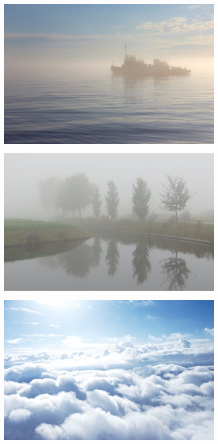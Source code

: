 \begin{figure}[H]
    \centering
    \includegraphics[width=\linewidth]{fogs/fog07.jpg} 
    \caption{}
    \label{fig:r7}
\end{figure}

\begin{figure}[H]
    \centering
    \includegraphics[width=\linewidth]{fogs/fog08.jpg} 
    \caption{}
    \label{fig:r8}
\end{figure}

\begin{figure}[H]
    \centering
    \includegraphics[width=\linewidth]{fogs/fog09.jpg} 
    \caption{}
    \label{fig:r9}
\end{figure}

